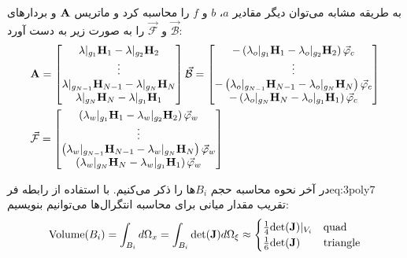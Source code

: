 به طریقه مشابه می‌توان دیگر مقادیر
 $a$، $b$ و $f$
را محاسبه کرد و ماتریس‌ $\textbf A$ و بردار‌های $\vec{\mathcal B}$ و $\vec{\mathcal F}$ را به صورت زیر به دست آورد:
\begin{equation}
\label{eq:3poly18}
\begin{aligned}
&\textbf A =
\begin{bmatrix}
	\lambda|_{g_1} \textbf H_1 - \lambda|_{g_2} \textbf H_2 \\
	\vdots \\ 
	\lambda|_{g_{N-1}} \textbf H_{N-1} - \lambda|_{g_{N}} \textbf H_N \\
	\lambda|_{g_N} \textbf H_N - \lambda|_{g_1} \textbf H_1
\end{bmatrix}
\vec {\mathcal B} = 
\begin{bmatrix}
	-\left( \lambda_o|_{g_1} \textbf H_1 - \lambda_o|_{g_2} \textbf H_2 \right) \vec \varphi_c \\
	 \vdots  \\ 
	-\left( \lambda_o|_{g_{N-1}} \textbf H_{N-1}- \lambda_o|_{g_{N}} \textbf H_N \right) \vec \varphi_c \\
	-\left( \lambda_o|_{g_N} \textbf H_N - \lambda_o|_{g_1} \textbf H_1  \right) \vec \varphi_c
\end{bmatrix} \\
&\vec {\mathcal F} = 
\begin{bmatrix}
	\left( \lambda_w|_{g_1} \textbf H_1 - \lambda_w|_{g_2} \textbf H_2 \right) \vec \varphi_w \\
	 \vdots  \\ 
	\left( \lambda_w|_{g_{N-1}} \textbf H_{N-1}- \lambda_w|_{g_{N}} \textbf H_N \right) \vec \varphi_w \\
	\left( \lambda_w|_{g_N} \textbf H_N - \lambda_w|_{g_1} \textbf H_1  \right) \vec \varphi_w
\end{bmatrix} 
\end{aligned}
\end{equation}

در آخر نحوه محاسبه حجم $B_i$ها را ذکر می‌کنیم. با استفاده از رابطه ‌فر{eq:3poly7} تقریب مقدار میانی برای محاسبه انتگرال‌ها می‌توانیم بنویسیم:
\begin{equation}
\label{eq:3poly19}
\text{Volume}(B_i) = \int_{B_i}d\Omega_x = \int_{B_i}\text{det}(\textbf J)d\Omega_\xi \approx
\begin{cases}
\frac{1}{4}\text{det}(\textbf J)|_{V_i} &\text{quad} \\
\frac{1}{6}\text{det}(\textbf J) &\text{triangle}
\end{cases}
\end{equation}

